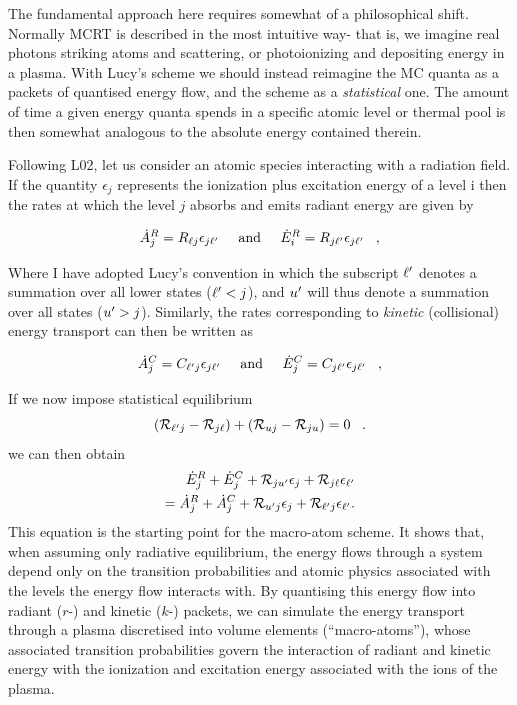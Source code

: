 The fundamental approach here requires somewhat of a philosophical shift.
Normally MCRT is described in the most intuitive way- that is, we imagine
real photons striking atoms and scattering, or photoionizing 
and depositing energy in a plasma. With Lucy's scheme we should instead 
reimagine the MC quanta as a packets of quantised energy flow, and the scheme as a 
{\em statistical} one. The amount of time a given energy quanta spends in a specific atomic
level or thermal pool is then somewhat analogous to the absolute energy 
contained therein.

Following L02, let us consider an atomic species interacting with a radiation field.
If the quantity $\epsilon_j$ represents the ionization plus excitation energy of 
a level i then the rates at which the level $j$ absorbs and emits radiant energy 
are given by

\begin{equation}
 \dot{A}_{j}^{R} = R_{\ell j} \epsilon_{j {\ell^\prime}} \;\;\;\;\; {\rm and} \;\;\;
\;\;  \dot{E}_{i}^{R} = R_{j {\ell^\prime}} \epsilon_{j {\ell^\prime}} \;\;\; ,
\end{equation}

Where I have adopted Lucy's convention in which the subscript 
${\ell^\prime}$ denotes a summation over all lower states (${\ell^\prime}<j$), and
${u^\prime}$ will thus denote a summation over all states (${u^\prime}>j$).
Similarly, the rates corresponding to {\em kinetic} (collisional)
energy transport can then be written as

\begin{equation}
 \dot{A}_{j}^{C} = C_{{\ell^\prime} j} \epsilon_{j {\ell^\prime}} \;\;\;\;\; {\rm and}
\;\;\;
\;\;  \dot{E}_{j}^{C} = C_{j {\ell^\prime}} \epsilon_{j {\ell^\prime}} \;\;\; ,
\end{equation}

If we now impose statistical equilibrium
%
\begin{equation}
 ({\cal R}_{{\ell^\prime} j}-{\cal R}_{j \ell})+({\cal R}_{uj}-{\cal R}_{ju})=0 \;\;\;.
\end{equation}
we can then obtain 
\begin{eqnarray}
 \dot{E}_{j}^{R}+\dot{E}_{j}^{C}+{\cal R}_{j{u^\prime}}\epsilon_{j}+
 {\cal R}_{j \ell}\epsilon_{{\ell^\prime}}  \nonumber \\  
 = \dot{A}_{j}^{R}+\dot{A}_{j}^{C}+{\cal R}_{{u^\prime} j} \epsilon_{j}
 +{\cal R}_{{\ell^\prime} j} \epsilon_{{\ell^\prime}}           .  
 \label{eq:matom_SE}     
\end{eqnarray}
This equation is the starting point for the macro-atom scheme. It shows 
that, when assuming only radiative equilibrium, the energy flows through
a system depend only on the transition probabilities and atomic physics
associated with the levels the energy flow interacts with.
By quantising this energy flow into radiant ($r$-) and kinetic ($k$-) packets, 
we can simulate the energy transport through
a plasma discretised into volume elements (``macro-atoms''),
whose associated transition probabilities govern the interaction 
of radiant and kinetic energy with the ionization and excitation energy associated 
with the ions of the plasma.

